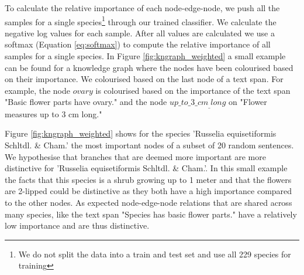 \documentclass[a4paper, 12pt, oneside]{book} %
\begin{document}
To calculate the relative importance of each node-edge-node, we push all the samples for a single species\footnote{We do not split the data into a train and test set and use all 229 species for training} through our trained classifier.
We calculate the negative log values for each sample.
After all values are calculated we use a softmax (Equation \ref{eq:softmax}) to compute the relative importance of all samples for a single species.
In Figure \ref{fig:kngraph_weighted} a small example can be found for a knowledge graph where the nodes have been colourised based on their importance.
We colourised based on the last node of a text span.
For example, the node $ovary$ is colourised based on the importance of the text span "Basic flower parts have ovary." and the node $up\_to\_3\_cm_\_long$ on "Flower measures up to 3 cm long."

Figure \ref{fig:kngraph_weighted} shows for the species 'Russelia equisetiformis Schltdl. \& Cham.' the most important nodes of a subset of 20 random sentences.
We hypothesise that branches that are deemed more important are more distinctive for 'Russelia equisetiformis Schltdl. \& Cham.'.
In this small example the facts that this species is a shrub growing up to 1 meter and that the flowers are 2-lipped could be distinctive as they both have a high importance compared to the other nodes.
As expected node-edge-node relations that are shared across many species, like the text span "Species has basic flower parts." have a relatively low importance and are thus distinctive. 
\end{document}
